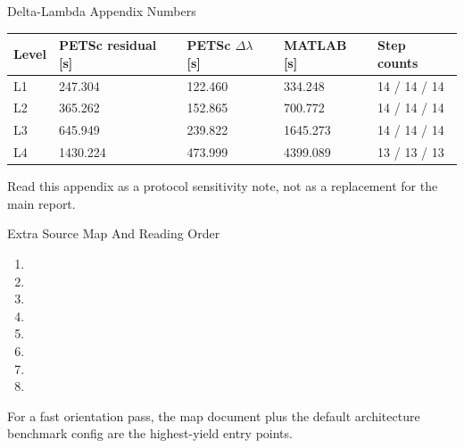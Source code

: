 \documentclass[aspectratio=169,10pt]{beamer}
\begin{document}
\begin{frame}{Delta-Lambda Appendix Numbers}
\small
\begin{tabularx}{\textwidth}{p{}M{0.18\textwidth}M{0.18\textwidth}M{0.16\textwidth}Y}
\toprule
\textbf{Level} & \textbf{PETSc residual [s]} & \textbf{PETSc \(\Delta\lambda\) [s]} & \textbf{MATLAB [s]} & \textbf{Step counts} \\
\midrule
L1 & 247.304 & 122.460 & 334.248 & 14 / 14 / 14 \\
L2 & 365.262 & 152.865 & 700.772 & 14 / 14 / 14 \\
L3 & 645.949 & 239.822 & 1645.273 & 14 / 14 / 14 \\
L4 & 1430.224 & 473.999 & 4399.089 & 13 / 13 / 13 \\
\bottomrule
\end{tabularx}
\vspace{0.18cm}
\begin{softbox}
Read this appendix as a protocol sensitivity note, not as a replacement for the main report.
\end{softbox}
\end{frame}

\begin{frame}{Extra Source Map And Reading Order}
\small
\begin{enumerate}
  \item {}
  \item {}
  \item {}
  \item {}
  \item {}
  \item {}
  \item {}
  \item {}
\end{enumerate}
\vspace{0.18cm}
\begin{callout}
For a fast orientation pass, the map document plus the default  architecture benchmark config are the highest-yield entry points.
\end{callout}
\end{frame}
\end{document}
